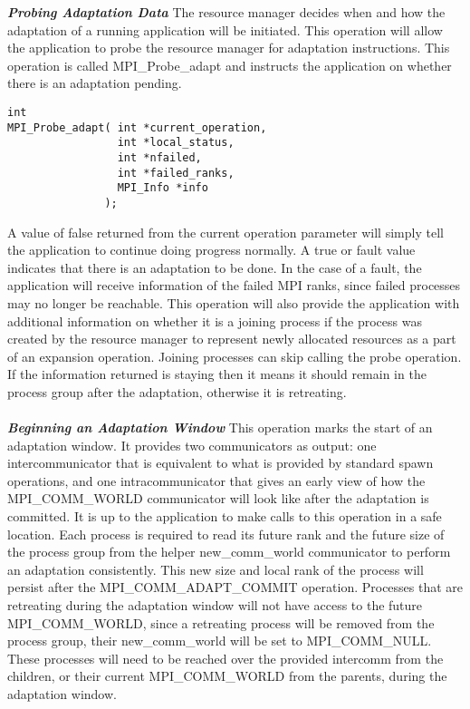 \textbf{\textit{Probing Adaptation Data}} The resource manager decides when and how the adaptation of a running application will be initiated. This operation will allow the application to probe the resource manager for adaptation instructions. This operation is called MPI{\_}Probe{\_}adapt and instructs the application on whether there is an adaptation pending.  
\begin{lstlisting}[frame=single]
int
MPI_Probe_adapt( int *current_operation,
                 int *local_status,
                 int *nfailed,
                 int *failed_ranks,
                 MPI_Info *info
               );
\end{lstlisting}
A value of false returned from the current operation parameter will simply tell the application to continue doing progress normally. A true or fault value indicates that there is an adaptation to be done. In the case of a fault, the application will receive information of the failed MPI ranks, since failed processes may no longer be reachable. This operation will also provide the application with additional information on whether it is a joining process if the process was created by the resource manager to represent newly allocated resources as a part of an expansion operation. Joining processes can skip calling the probe operation. If the information returned is staying then it means it should remain in the process group after the adaptation, otherwise it is retreating.\\ \\
\textbf{\textit{Beginning an Adaptation Window}} This operation marks the start of an adaptation window. It provides two communicators as output: one intercommunicator that is equivalent to what is provided by standard spawn operations, and one intracommunicator that gives an early view of how the MPI{\_}COMM{\_}WORLD communicator will look like after the adaptation is committed. It is up to the application to make calls to this operation in a safe location. Each process is required to read its future rank and the future  size of the process group from the helper new{\_}comm{\_}world communicator to perform an adaptation consistently. This new size and local rank of the process will persist after the MPI{\_}COMM{\_}ADAPT{\_}COMMIT operation. Processes that are retreating during the adaptation window will not have access to the future MPI{\_}COMM{\_}WORLD, since a retreating process will be removed from the process group, their new{\_}comm{\_}world will be set to MPI{\_}COMM{\_}NULL. These processes will need to be reached over the provided intercomm from the children, or their current MPI{\_}COMM{\_}WORLD from the parents, during the adaptation window.
